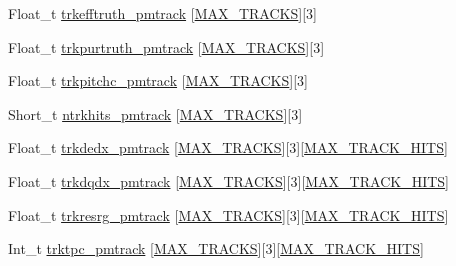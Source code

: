 \begin{DoxyCompactItemize}
Float\-\_\-t \hyperlink{classanatree_a99202f1b486359afbf859093f5ac605e}{trkefftruth\-\_\-pmtrack} \mbox{[}\hyperlink{anatree__core__v09410002_8h_a327fd4e796e4a0d78947524c96e4362e}{M\-A\-X\-\_\-\-T\-R\-A\-C\-K\-S}\mbox{]}\mbox{[}3\mbox{]}
\item 
Float\-\_\-t \hyperlink{classanatree_a47b12693af49f90dada374e0d0f9105f}{trkpurtruth\-\_\-pmtrack} \mbox{[}\hyperlink{anatree__core__v09410002_8h_a327fd4e796e4a0d78947524c96e4362e}{M\-A\-X\-\_\-\-T\-R\-A\-C\-K\-S}\mbox{]}\mbox{[}3\mbox{]}
\item 
Float\-\_\-t \hyperlink{classanatree_aa842f0282de766208616772211b5e34f}{trkpitchc\-\_\-pmtrack} \mbox{[}\hyperlink{anatree__core__v09410002_8h_a327fd4e796e4a0d78947524c96e4362e}{M\-A\-X\-\_\-\-T\-R\-A\-C\-K\-S}\mbox{]}\mbox{[}3\mbox{]}
\item 
Short\-\_\-t \hyperlink{classanatree_ae637a1305dfcb662e4696778c24e6972}{ntrkhits\-\_\-pmtrack} \mbox{[}\hyperlink{anatree__core__v09410002_8h_a327fd4e796e4a0d78947524c96e4362e}{M\-A\-X\-\_\-\-T\-R\-A\-C\-K\-S}\mbox{]}\mbox{[}3\mbox{]}
\item 
Float\-\_\-t \hyperlink{classanatree_ad7277a76b6bcb971d0a96943117954d6}{trkdedx\-\_\-pmtrack} \mbox{[}\hyperlink{anatree__core__v09410002_8h_a327fd4e796e4a0d78947524c96e4362e}{M\-A\-X\-\_\-\-T\-R\-A\-C\-K\-S}\mbox{]}\mbox{[}3\mbox{]}\mbox{[}\hyperlink{anatree__core__v09410002_8h_ae75eb9050f16aa034339f05572523070}{M\-A\-X\-\_\-\-T\-R\-A\-C\-K\-\_\-\-H\-I\-T\-S}\mbox{]}
\item 
Float\-\_\-t \hyperlink{classanatree_a58473ac725f05967148c689020e3d771}{trkdqdx\-\_\-pmtrack} \mbox{[}\hyperlink{anatree__core__v09410002_8h_a327fd4e796e4a0d78947524c96e4362e}{M\-A\-X\-\_\-\-T\-R\-A\-C\-K\-S}\mbox{]}\mbox{[}3\mbox{]}\mbox{[}\hyperlink{anatree__core__v09410002_8h_ae75eb9050f16aa034339f05572523070}{M\-A\-X\-\_\-\-T\-R\-A\-C\-K\-\_\-\-H\-I\-T\-S}\mbox{]}
\item 
Float\-\_\-t \hyperlink{classanatree_a85f1b778c6742491c6c574120586bef3}{trkresrg\-\_\-pmtrack} \mbox{[}\hyperlink{anatree__core__v09410002_8h_a327fd4e796e4a0d78947524c96e4362e}{M\-A\-X\-\_\-\-T\-R\-A\-C\-K\-S}\mbox{]}\mbox{[}3\mbox{]}\mbox{[}\hyperlink{anatree__core__v09410002_8h_ae75eb9050f16aa034339f05572523070}{M\-A\-X\-\_\-\-T\-R\-A\-C\-K\-\_\-\-H\-I\-T\-S}\mbox{]}
\item 
Int\-\_\-t \hyperlink{classanatree_a9c7c79379748df8edd2db8055b236311}{trktpc\-\_\-pmtrack} \mbox{[}\hyperlink{anatree__core__v09410002_8h_a327fd4e796e4a0d78947524c96e4362e}{M\-A\-X\-\_\-\-T\-R\-A\-C\-K\-S}\mbox{]}\mbox{[}3\mbox{]}\mbox{[}\hyperlink{anatree__core__v09410002_8h_ae75eb9050f16aa034339f05572523070}{M\-A\-X\-\_\-\-T\-R\-A\-C\-K\-\_\-\-H\-I\-T\-S}\mbox{]}

\end{DoxyCompactItemize}
